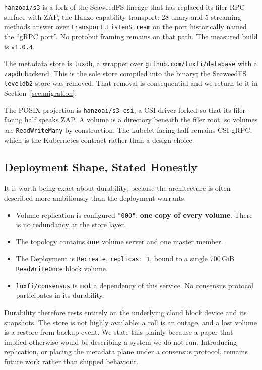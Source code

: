\documentclass[11pt]{article}
\begin{document}
\texttt{hanzoai/s3} is a fork of the SeaweedFS lineage that has replaced its
filer RPC surface with ZAP, the Hanzo capability transport: 28 unary and 5
streaming methods answer over \texttt{transport.ListenStream} on the port
historically named the ``gRPC port''. No protobuf framing remains on that
path. The measured build is \texttt{v1.0.4}.

The metadata store is \texttt{luxdb}, a wrapper over
\texttt{github.com/luxfi/database} with a \texttt{zapdb} backend. This is the
sole store compiled into the binary; the SeaweedFS \texttt{leveldb2} store was
removed. That removal is consequential and we return to it in
Section~\ref{sec:migration}.

The POSIX projection is \texttt{hanzoai/s3-csi}, a CSI driver forked so that
its filer-facing half speaks ZAP. A volume is a directory beneath the filer
root, so volumes are \texttt{ReadWriteMany} by construction. The
kubelet-facing half remains CSI gRPC, which is the Kubernetes contract rather
than a design choice.

\subsection{Deployment Shape, Stated Honestly}
\label{sec:durability}

It is worth being exact about durability, because the architecture is often
described more ambitiously than the deployment warrants.

\begin{itemize}
  \item Volume replication is configured \texttt{"000"}: \textbf{one copy of
        every volume}. There is no redundancy at the store layer.
  \item The topology contains \textbf{one} volume server and one master
        member.
  \item The Deployment is \texttt{Recreate}, \texttt{replicas: 1}, bound to a
        single 700\,GiB \texttt{ReadWriteOnce} block volume.
  \item \texttt{luxfi/consensus} is \textbf{not} a dependency of this
        service. No consensus protocol participates in its durability.
\end{itemize}

Durability therefore rests entirely on the underlying cloud block device and
its snapshots. The store is not highly available: a roll is an outage, and a
lost volume is a restore-from-backup event. We state this plainly because a
paper that implied otherwise would be describing a system we do not run.
Introducing replication, or placing the metadata plane under a consensus
protocol, remains future work rather than shipped behaviour.
\end{document}
